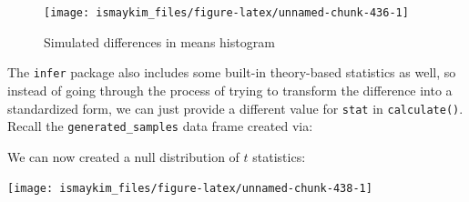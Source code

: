\documentclass[12pt, krantz2,]{krantz}
\makeatletter
\newenvironment{Shaded}{\begin{snugshade}}{\end{snugshade}}
\newcommand{\DataTypeTok}[1]{\textcolor[rgb]{0.27,0.27,0.27}{#1}}
\newcommand{\DecValTok}[1]{\textcolor[rgb]{0.06,0.06,0.06}{#1}}
\newcommand{\KeywordTok}[1]{\textcolor[rgb]{0.27,0.27,0.27}{\textbf{#1}}}
\newcommand{\NormalTok}[1]{#1}
\newcommand{\OperatorTok}[1]{\textcolor[rgb]{0.43,0.43,0.43}{\textbf{#1}}}
\newcommand{\StringTok}[1]{\textcolor[rgb]{0.5,0.5,0.5}{#1}}
\newenvironment{kframe}{%
\medskip{}
\setlength{\fboxsep}{.8em}
 \def\at@end@of@kframe{}%
 \ifinner\ifhmode%
  \def\at@end@of@kframe{\end{minipage}}%
  \begin{minipage}{\columnwidth}%
 \fi\fi%
 \def\FrameCommand##1{\hskip\@totalleftmargin \hskip-\fboxsep
 \colorbox{shadecolor}{##1}\hskip-\fboxsep
     \hskip-\linewidth \hskip-\@totalleftmargin \hskip\columnwidth}%
 \MakeFramed {\advance\hsize-\width
   \@totalleftmargin\z@ \linewidth\hsize
   \@setminipage}}%
 {\par\unskip\endMakeFramed%
 \at@end@of@kframe}
\renewenvironment{Shaded}{\begin{kframe}}{\end{kframe}}
\makeatother
\begin{document}
\begin{figure}

{\centering \texttt{[image: ismaykim\_files/figure-latex/unnamed-chunk-436-1]} 

}

\caption{Simulated differences in means histogram}\label{fig:unnamed-chunk-436}
\end{figure}

The \texttt{infer} package also includes some built-in theory-based statistics as well, so instead of going through the process of trying to transform the difference into a standardized form, we can just provide a different value for \texttt{stat} in \texttt{calculate()}. Recall the \texttt{generated\_samples} data frame created via:

\begin{Shaded}
\end{Shaded}

We can now created a null distribution of \(t\) statistics:

\begin{Shaded}
\end{Shaded}

\begin{center}\texttt{[image: ismaykim\_files/figure-latex/unnamed-chunk-438-1]} \end{center}
\end{document}
